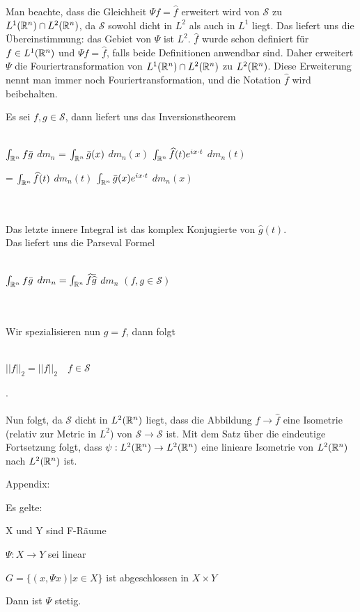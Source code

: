 \documentclass{article}
\begin{document}
\begin{bemerkung}
Man beachte, dass die Gleichheit $\Psi f = \widehat{f}$ erweitert wird von $\mathcal{S}$ zu $L^1(\mathbb{R}^n) \cap L^2(\mathbb{R}^n)$, 
da $\mathcal{S}$ sowohl dicht in $L^2$ als auch in $L^1$ liegt. Das liefert uns die Übereinstimmung: das Gebiet von $\Psi$ ist $L^2$. 
$\widehat{f}$ wurde schon definiert für $f \in L^1(\mathbb{R}^n)$ und $\Psi f = \widehat{f}$, falls beide Definitionen anwendbar sind. Daher 
erweitert $\Psi$ die Fouriertransformation von $L^1(\mathbb{R}^n) \cap L^2(\mathbb{R}^n)$ zu $L^2(\mathbb{R}^n)$. Diese Erweiterung nennt man
immer noch Fouriertransformation, und die Notation $\widehat{f}$ wird beibehalten.
\end{bemerkung}
\begin{beweis}
Es sei $f, g \in \mathcal{S}$, dann liefert uns das Inversionstheorem \\ \\
\centerline{$\int_{\mathbb{R}^n} f \bar{g}$ $d m_n$ = 
            $\int_{\mathbb{R}^n} \bar{g}(x) $ $d m_n(x)$ $\int_{\mathbb{R}^n} \widehat{f}(t) e^{ix \cdot t} $ $d m_n(t)$ } 
\centerline{= $\int_{\mathbb{R}^n} \widehat{f}(t) $ $d m_n(t)$ $\int_{\mathbb{R}^n} \bar{g}(x) e^{ix \cdot t} $ $d m_n(x)$} \\ \\
Das letzte innere Integral ist das komplex Konjugierte von $\widehat{g}(t)$. \\ Das liefert uns die Parseval Formel \\ \\
\centerline{$\int_{\mathbb{R}^n} f \bar{g}$ $d m_n = \int_{\mathbb{R}^n} \widehat{f} \bar{\widehat{g}}$ $d m_n$  $(f,g \in \mathcal{S})$} \\ \\
Wir spezialisieren nun $g = f$, dann folgt \\ \\
\centerline{$|| f ||_2 = ||\widehat{f}||_2 \quad f \in \mathcal{S}$}. \\ \\ 
Nun folgt, da $\mathcal{S}$ dicht in $L^2(\mathbb{R}^n)$ liegt, dass die Abbildung $f \to \widehat{f}$ eine Isometrie 
(relativ zur Metric in $L^2$) von $\mathcal{S} \to \mathcal{S}$ ist. Mit dem Satz über die eindeutige Fortsetzung folgt, 
dass $\psi: L^2(\mathbb{R}^n) \to L^2(\mathbb{R}^n)$ eine linieare Isometrie von $L^2(\mathbb{R}^n)$ nach $L^2(\mathbb{R}^n)$ ist.

\end{beweis}

Appendix:

\begin{satz}
Es gelte:
\begin{liste}
\item X und Y sind F-Räume
\item $\Psi: X \to Y$ sei linear
\item $G = \{(x, \Psi x) | x \in X \}$ ist abgeschlossen in $X \times Y$ 
\end{liste} 
Dann ist $\Psi$ stetig.
\end{satz}
\end{document}
